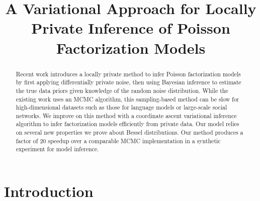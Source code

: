 \documentclass{article}
\title{A Variational Approach for Locally Private Inference of Poisson Factorization Models}
\author{} %
\begin{document}
\maketitle

\begin{abstract}
    Recent work \citep{schein2018locally} introduces a locally private method to
    infer Poisson factorization models by first applying differentially private
    noise, then using Bayesian inference to estimate the true data priors given
    knowledge of the random noise distribution. While the existing work uses an
    MCMC algorithm, this sampling-based method can be slow for high-dimensional
    datasets such as those for language models or large-scale social networks.
    We improve on this method with a coordinate ascent variational inference
    algorithm to infer factorization models efficiently from private data. Our
    model relies on several new properties we prove about Bessel distributions.
    Our method produces a factor of 20 speedup over a comparable MCMC
    implementation in a synthetic experiment for model inference.
  \end{abstract}

  \section{Introduction}
  
\end{document}
